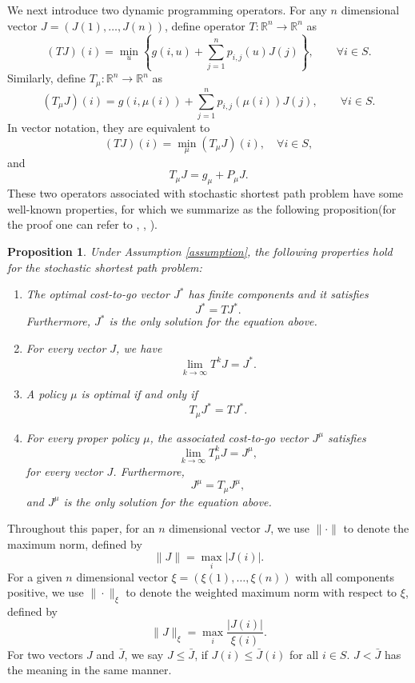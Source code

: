 \documentclass[12pt,a4paper]{amsart}
\numberwithin{equation}{section}
\theoremstyle{plain}
\newtheorem{Prop}[Th]{Proposition}
\theoremstyle{definition}
\begin{document}
We next introduce two dynamic programming operators. For any $n$ dimensional vector $J = (J(1), \dots, J(n))$, define operator $T: \mathbb{R}^n \to \mathbb{R}^n$ as 
$$
(TJ)(i)  = \min_{u} \left\{ g(i, u) + \sum_{j=1}^{n} p_{i,j}(u) J(j)  \right\},  \qquad \forall i \in S.
$$
Similarly, define $T_{\mu}: \mathbb{R}^n \to \mathbb{R}^n$ as 
$$
(T_{\mu}J)(i) = g(i, \mu(i)) + \sum_{j=1}^{n} p_{i,j}(\mu(i)) J(j), \qquad \forall i \in S.  
$$
In vector notation, they are equivalent to
$$
(TJ)(i) = \min_{\mu} (T_{\mu}J)(i), \quad \forall i \in S,
$$
and
$$
T_{\mu} J = g_{\mu} + P_{\mu} J.
$$
These two operators associated with stochastic shortest path problem have some well-known properties, for which we summarize as the following proposition(for the proof one can refer to \cite{Be00}, \cite{BeT89}, \cite{BeT91} ).
\begin{Prop}\label{propdp}
	Under Assumption \ref{assumption}, the following properties hold for the stochastic shortest path problem:
	\begin{enumerate}
		\item[(a)] The optimal cost-to-go vector $J^{*}$ has finite components and it satisfies
		\begin{equation*} \label{eqop}
		J^{*}  = TJ^{*}.
		\end{equation*}
		Furthermore, $J^{*}$ is the only solution for the equation above.
		\item[(b)] For every vector $J$, we have
		$$
		\lim_{k \to \infty} T^k J = J^{*}.
		$$
		\item[(c)] A policy $\mu$ is optimal if and only if 
		$$
		T_{\mu} J^{*} = T J^{*}.
		$$
		\item[(d)] For every proper policy $\mu$, the associated cost-to-go vector $J^{\mu}$ satisfies $$
		\lim_{k \to \infty} T_{\mu}^{k} J = J^{\mu},
		$$
		for every vector $J$. Furthermore,
		$$
		J^{\mu} = T_{\mu} J^{\mu},
		$$
		and $J^{\mu}$ is the only solution for the equation above.
	\end{enumerate}
\end{Prop}

Throughout this paper, for an $n$ dimensional vector $J$, we use $\|\cdot\|$ to denote the maximum norm,  defined by  
$$\|J\| = \max_{i} |J(i)|.$$ 
For a given $n$ dimensional vector $\xi = \left(\xi(1), \dots, \xi(n) \right)$ with all components positive, we use $\|\cdot\|_{\xi}$ to denote the weighted maximum norm with respect to $\xi$, defined by
$$
\|J\|_{\xi} = \max_{i} \frac{|J(i)|}{\xi(i)}.
$$
For two vectors $J$ and $\bar{J}$, we say $J \le \bar{J}$, if $J(i) \le \bar{J}(i)$ for all $i \in S$. $J < \bar{J}$ has the meaning in the same manner. 
\end{document}

